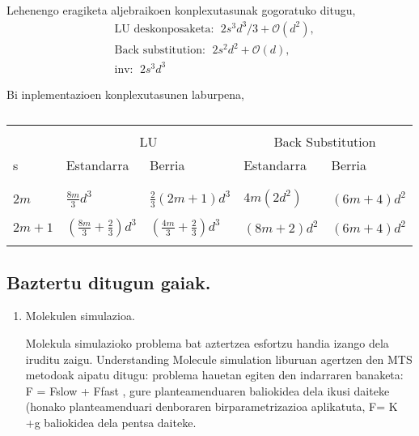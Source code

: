 Lehenengo eragiketa aljebraikoen konplexutasunak gogoratuko ditugu,
\begin{align*}
&\text{LU deskonposaketa}:  \ \ 2s^3d^3/3+\mathcal{O}(d^2), \\
&\text{Back substitution}:  \ \ 2s^2d^2+\mathcal{O}(d), \\
&\text{inv}: \ \ 2s^3d^3
\end{align*}

Bi inplementazioen konplexutasunen laburpena,
\begin{table}[h!]
\caption[LU deskonposaketak] 
{\small{}}
\label{tab:Olu}       
\centering
{%
\begin{tabular}{ l l l l l } 
 \hline
\\
                 &  \multicolumn{2}{c}{LU}  & \multicolumn{2}{c}{Back Substitution}  \\
 s               & Estandarra  & Berria     &  Estandarra  &              Berria     \\
\\
 \hline
\\
 $2m$            &   $\frac{8m}{3} d^3$                              &  $\frac{2}{3} (2m+1) d^3$ 
                 &   $4m (2d^2)$      &     $(6m+4)d^2$                                             \\
 \\
 $2m+1$          &   $\left(\frac{8m}{3} + \frac{2}{3}\right) d^3$   &  $\left(\frac{4m}{3}+\frac{2}{3}\right) d^3$
                 &   $(8m+2)d^2$      &     $(6m+4)d^2$\\  
 \\  
   \hline
 \end{tabular}}
\end{table}

\subsection*{Baztertu ditugun gaiak.}

\begin{enumerate}
\item Molekulen simulazioa.

Molekula simulazioko problema bat aztertzea esfortzu handia izango dela iruditu zaigu. Understanding
Molecule simulation liburuan agertzen den MTS metodoak aipatu ditugu: problema hauetan egiten den
indarraren banaketa: F = Fslow + Ffast , gure planteamenduaren baliokidea dela ikusi daiteke (honako
planteamenduari denboraren birparametrizazioa aplikatuta, F= K +g baliokidea dela pentsa daiteke.

\end{enumerate}


